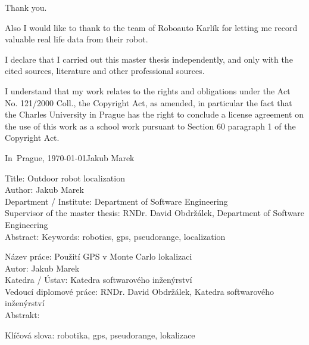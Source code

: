 

\vspace{10mm} 

Thank you.

Also I would like to thank to the team of Roboauto Karlík for letting me
record valuable real life data from their robot.

\newpage

\vspace*{\fill}
I declare that I carried out this master thesis independently, and only with the cited
sources, literature and other professional sources.

I understand that my work relates to the rights and obligations under the Act No.
121/2000 Coll., the Copyright Act, as amended, in particular the fact that the Charles
University in Prague has the right to conclude a license agreement on the use of this
work as a school work pursuant to Section 60 paragraph 1 of the Copyright Act.

\vspace{10mm} 
\noindent In~Prague, \today\hspace{\fill}Jakub Marek\\
\newpage

\tableofcontents*
\newpage

\noindent
Title: Outdoor robot localization\\
Author: Jakub Marek\\
Department / Institute: Department of Software Engineering\\
Supervisor of the master thesis: RNDr. David Obdržálek, Department of Software Engineering\\

\noindent Abstract: 
\noindent Keywords: robotics, gps, pseudorange, localization

\vspace{25mm}

\noindent
Název práce: Použití GPS v Monte Carlo lokalizaci\\
Autor: Jakub Marek\\
Katedra / Ústav: Katedra softwarového inženýrství\\
Vedoucí diplomové práce: RNDr. David Obdržálek, Katedra softwarového inženýrství\\

\noindent Abstrakt: 

\noindent Klíčová slova: robotika, gps, pseudorange, lokalizace

\newpage

